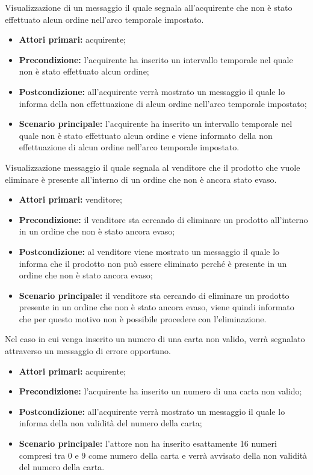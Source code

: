 Visualizzazione di un messaggio il quale segnala all'acquirente che non è stato effettuato alcun ordine nell'arco temporale impostato.
\begin{itemize}
    \item \textbf{Attori primari:} acquirente;
    \item \textbf{Precondizione:} l'acquirente ha inserito un intervallo temporale nel quale non è stato effettuato alcun ordine;
    \item \textbf{Postcondizione:} all'acquirente verrà mostrato un messaggio il quale lo informa della non effettuazione di alcun ordine nell'arco temporale impostato;
    \item \textbf{Scenario principale:} l'acquirente ha inserito un intervallo temporale nel quale non è stato effettuato alcun ordine e viene informato della non effettuazione di alcun ordine nell'arco temporale impostato.
\end{itemize}

Visualizzazione messaggio il quale segnala al venditore che il prodotto che vuole eliminare è presente all'interno di un ordine che non è ancora stato evaso.
\begin{itemize}
    \item \textbf{Attori primari:} venditore;
    \item \textbf{Precondizione:} il venditore sta cercando di eliminare un prodotto all'interno in un ordine che non è stato ancora evaso;
    \item \textbf{Postcondizione:} al venditore viene mostrato un messaggio il quale lo informa che il prodotto non può essere eliminato perché è presente in un ordine che non è stato ancora evaso;
    \item \textbf{Scenario principale:} il venditore sta cercando di eliminare un prodotto presente in un ordine che non è stato ancora evaso, viene quindi informato che per questo motivo non è possibile procedere con l'eliminazione.
\end{itemize}

Nel caso in cui venga inserito un numero di una carta non valido, verrà segnalato attraverso un messaggio di errore opportuno.
\begin{itemize}
	\item \textbf{Attori primari:} acquirente;
	\item \textbf{Precondizione:} l'acquirente ha inserito un numero di una carta non valido;
	\item \textbf{Postcondizione:} all'acquirente verrà mostrato un messaggio il quale lo informa della non validità del numero della carta;
	\item \textbf{Scenario principale:} l'attore non ha inserito esattamente 16 numeri compresi tra 0 e 9 come numero della carta e verrà avvisato della non validità del numero della carta.
\end{itemize}

